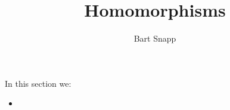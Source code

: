 \documentclass{ximera}
\author{Bart Snapp}
\title{Homomorphisms}
\begin{document}
\begin{abstract}
\end{abstract}
\maketitle
In this section we:

\begin{itemize}
\item 
\end{itemize}
\end{document}
